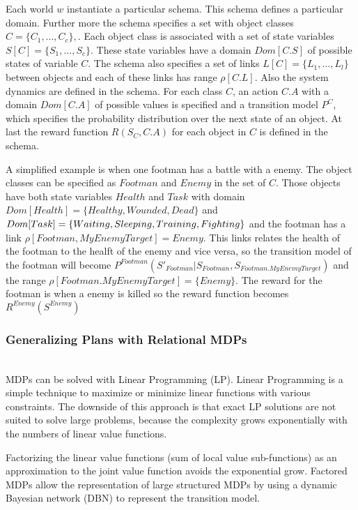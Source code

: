 Each world $w$ instantiate a particular schema. This schema defines a particular domain. Further more the schema specifies a set with object classes $C = \{C_{1},...,C_{c} \},$. Each object class is associated with a set of state variables $S[C] = \{ S_{1},...,S_{c}\}$. These state variables have a domain $Dom[C.S]$ of possible states of variable $C$. 
The schema also specifies a set of links $L[C] = \{L_{1},...,L_{l}\}$  between objects and each of these links has range $\rho[C.L]$.
Also the system dynamics are defined in the schema. For each class $C$, an action $C.A$ with a domain $Dom[C.A]$ of possible values is specified and a transition model $P^{C}$, which specifies the probability distribution over the next state of an object.
At last the reward function $R (S_{C}, C.A)$ for each object in $C$ is defined in the schema.

A simplified example is when one footman has a battle with a enemy. The object classes can be specified as $Footman$ and $Enemy$ in the set of $C$. Those objects have both state variables $Health$ and $Task$ with domain $Dom[Health] = \{Healthy, Wounded, Dead\}$ and $Dom[Task] = \{Waiting, Sleeping, Training, \\ Fighting\}$ and the footman has a link $\rho[Footman, MyEnemyTarget] = Enemy$. This links relates the health of the footman to the healft of the enemy and vice versa, so the transition model of the footman will become $P^{Footman} (S'_{Footman} | S_{Footman}, S_{Footman.MyEnemyTarget})$ and the range $\rho[Footman.MyEnemyTarget] = \{ Enemy \}$. The reward for the footman is when a enemy is killed so the reward function becomes $R^{Enemy}(S^{Enemy})$


\subsubsection{Generalizing Plans with Relational MDPs} ~\\

MDPs can be solved with Linear Programming (LP).
Linear Programming is a simple technique to maximize or minimize linear functions with various constraints.
The downside of this approach is that exact LP solutions are not suited to solve large problems, because the complexity grows exponentially with the numbers of linear value functions.

Factorizing the linear value functions (sum of local value sub-functions) as an approximation to the joint value function avoids the exponential grow. 
Factored MDPs allow the representation of large structured MDPs by using a dynamic Bayesian network (DBN) to represent the transition model.\citep{NIPS2001_1941}

